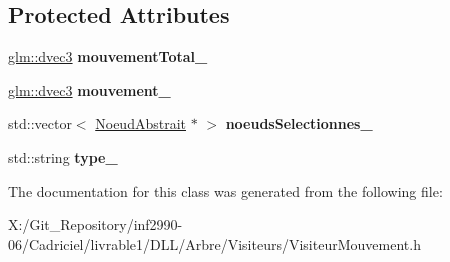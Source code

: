 \subsection*{Protected Attributes}
\begin{DoxyCompactItemize}
\item 
\hypertarget{group__inf2990_gabf8be4132bd566dfd54ff567c6224ef6}{\hyperlink{group__core__types_ga7f3287f952e6ccb481231368091702ac}{glm\-::dvec3} {\bfseries mouvement\-Total\-\_\-}}\label{group__inf2990_gabf8be4132bd566dfd54ff567c6224ef6}

\item 
\hypertarget{group__inf2990_gadfa30780cc765e2118c90c10007c1715}{\hyperlink{group__core__types_ga7f3287f952e6ccb481231368091702ac}{glm\-::dvec3} {\bfseries mouvement\-\_\-}}\label{group__inf2990_gadfa30780cc765e2118c90c10007c1715}

\item 
\hypertarget{group__inf2990_gafb495f95e07949f1c92e8a3940e1b5b2}{std\-::vector$<$ \hyperlink{class_noeud_abstrait}{Noeud\-Abstrait} $\ast$ $>$ {\bfseries noeuds\-Selectionnes\-\_\-}}\label{group__inf2990_gafb495f95e07949f1c92e8a3940e1b5b2}

\item 
\hypertarget{group__inf2990_gad2d8d1980d0be08ffdf44e0e5e3df09f}{std\-::string {\bfseries type\-\_\-}}\label{group__inf2990_gad2d8d1980d0be08ffdf44e0e5e3df09f}

\end{DoxyCompactItemize}


The documentation for this class was generated from the following file\-:\begin{DoxyCompactItemize}
\item 
X\-:/\-Git\-\_\-\-Repository/inf2990-\/06/\-Cadriciel/livrable1/\-D\-L\-L/\-Arbre/\-Visiteurs/Visiteur\-Mouvement.\-h\end{DoxyCompactItemize}
